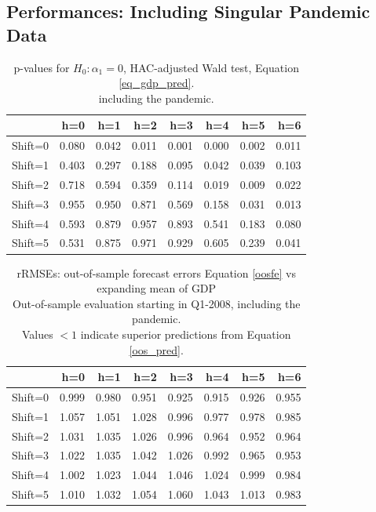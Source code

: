 \documentclass[11pt,a4paper]{article}
\begin{document}
\newpage
\subsection{Performances: Including Singular Pandemic Data}



\begin{table}[ht]
\centering
\begin{tabular}{rrrrrrrr}
  \hline
 & h=0 & h=1 & h=2 & h=3 & h=4 & h=5 & h=6 \\ 
  \hline
Shift=0 & 0.080 & 0.042 & 0.011 & 0.001 & 0.000 & 0.002 & 0.011 \\ 
  Shift=1 & 0.403 & 0.297 & 0.188 & 0.095 & 0.042 & 0.039 & 0.103 \\ 
  Shift=2 & 0.718 & 0.594 & 0.359 & 0.114 & 0.019 & 0.009 & 0.022 \\ 
  Shift=3 & 0.955 & 0.950 & 0.871 & 0.569 & 0.158 & 0.031 & 0.013 \\ 
  Shift=4 & 0.593 & 0.879 & 0.957 & 0.893 & 0.541 & 0.183 & 0.080 \\ 
  Shift=5 & 0.531 & 0.875 & 0.971 & 0.929 & 0.605 & 0.239 & 0.041 \\ 
   \hline
\end{tabular}
\caption{p-values for $H_0: {\alpha_1} = 0$, HAC-adjusted Wald test, Equation \eqref{eq_gdp_pred}.\\ including the pandemic.} 
\label{p_val1}
\end{table}%
\begin{table}[ht]
\centering
\begin{tabular}{rrrrrrrr}
  \hline
 & h=0 & h=1 & h=2 & h=3 & h=4 & h=5 & h=6 \\ 
  \hline
Shift=0 & 0.999 & 0.980 & 0.951 & 0.925 & 0.915 & 0.926 & 0.955 \\ 
  Shift=1 & 1.057 & 1.051 & 1.028 & 0.996 & 0.977 & 0.978 & 0.985 \\ 
  Shift=2 & 1.031 & 1.035 & 1.026 & 0.996 & 0.964 & 0.952 & 0.964 \\ 
  Shift=3 & 1.022 & 1.035 & 1.042 & 1.026 & 0.992 & 0.965 & 0.953 \\ 
  Shift=4 & 1.002 & 1.023 & 1.044 & 1.046 & 1.024 & 0.999 & 0.984 \\ 
  Shift=5 & 1.010 & 1.032 & 1.054 & 1.060 & 1.043 & 1.013 & 0.983 \\  
   \hline
\end{tabular}
\caption{rRMSEs: out-of-sample forecast errors Equation \eqref{oosfe} vs expanding mean of GDP\\Out-of-sample evaluation starting in Q1-2008, including the pandemic.\\Values $< 1$ indicate superior predictions from Equation \eqref{oos_pred}.} 
\label{rRMSE_mSSA_comp_mean2}
\end{table}%
\end{document}
